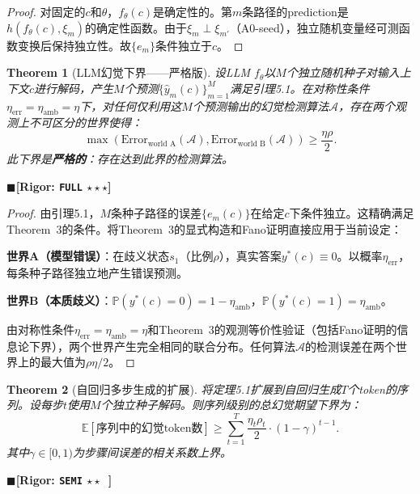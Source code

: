\documentclass[12pt,a4paper]{ctexart}
\newtheorem{theorem}{Theorem}[section]
\theoremstyle{definition}
\theoremstyle{remark}
\newcommand{\rigorFull}{$\blacksquare$\;\textbf{[Rigor: \texttt{FULL} $\star\star\star$]}}
\newcommand{\rigorSemi}{$\blacksquare$\;\textbf{[Rigor: \texttt{SEMI} $\star\star\;\;$]}}
\begin{document}
\begin{proof}
对固定的$c$和$\theta$，$f_\theta(c)$是确定性的。第$m$条路径的prediction是$h(f_\theta(c), \xi_m)$的确定性函数。由于$\xi_m \perp \xi_{m'}$（A0-seed），独立随机变量经可测函数变换后保持独立性。故$\{e_m\}$条件独立于$c$。
\end{proof}

\begin{theorem}[LLM幻觉下界——严格版]
\label{thm:5.1}
设LLM $f_\theta$以$M$个独立随机种子对输入上下文$c$进行解码，产生$M$个预测$\{\hat{y}_m(c)\}_{m=1}^M$满足引理5.1。在对称性条件$\eta_{\text{err}} = \eta_{\text{amb}} = \eta$下，对任何仅利用这$M$个预测输出的幻觉检测算法$\mathcal{A}$，存在两个观测上不可区分的世界使得：
\begin{equation}
\boxed{\max\left(\text{Error}_{\text{world A}}(\mathcal{A}), \text{Error}_{\text{world B}}(\mathcal{A})\right) \geq \frac{\eta\rho}{2}}.
\end{equation}
此下界是\textbf{严格的}：存在达到此界的检测算法。
\end{theorem}
\rigorFull

\begin{proof}
由引理5.1，$M$条种子路径的误差$\{e_m(c)\}$在给定$c$下条件独立。这精确满足Theorem~3的条件。将Theorem~3的显式构造和Fano证明直接应用于当前设定：

\textbf{世界A（模型错误）}：在歧义状态$s_1$（比例$\rho$），真实答案$y^*(c) \equiv 0$。以概率$\eta_{\text{err}}$，每条种子路径独立地产生错误预测。

\textbf{世界B（本质歧义）}：$\mathbb{P}(y^*(c)=0) = 1-\eta_{\text{amb}}$，$\mathbb{P}(y^*(c)=1) = \eta_{\text{amb}}$。

由对称性条件$\eta_{\text{err}} = \eta_{\text{amb}} = \eta$和Theorem~3的观测等价性验证（包括Fano证明的信息论下界），两个世界产生完全相同的联合分布。任何算法$\mathcal{A}$的检测误差在两个世界上的最大值为$\rho\eta/2$。
\end{proof}

\begin{theorem}[自回归多步生成的扩展]
\label{thm:5.2}
将定理5.1扩展到自回归生成$T$个token的序列。设每步$t$使用$M$个独立种子解码。则序列级别的总幻觉期望下界为：
\begin{equation}
\boxed{\mathbb{E}[\text{序列中的幻觉token数}] \geq \sum_{t=1}^{T} \frac{\eta_t\rho_t}{2} \cdot (1 - \gamma)^{t-1}}.
\end{equation}
其中$\gamma \in [0, 1)$为步骤间误差的相关系数上界。
\end{theorem}
\rigorSemi
\end{document}
